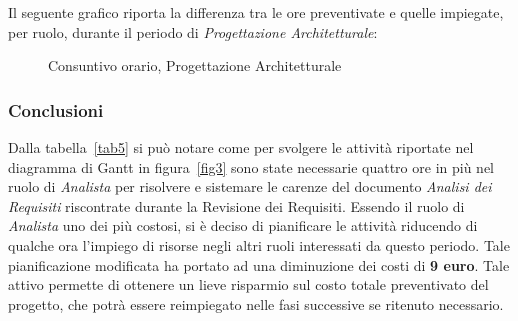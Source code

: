 \newpage
\noindent Il seguente grafico riporta la differenza tra le ore preventivate e quelle impiegate, per ruolo, durante il periodo di \textit{Progettazione Architetturale}:
\begin{figure}[h]
	\centering
	\caption{Consuntivo orario, Progettazione Architetturale}
\end{figure}

\subsubsection{Conclusioni}
Dalla tabella~\ref{tab5} si può notare come per svolgere le attività riportate nel diagramma di \gls{Gantt} in figura~\ref{fig3} sono state necessarie  quattro ore in più nel ruolo di \textit{Analista} per risolvere e sistemare le carenze del documento \textit{Analisi dei Requisiti} riscontrate durante la Revisione dei Requisiti. Essendo il ruolo di \textit{Analista} uno dei più costosi, si è deciso di pianificare le attività riducendo di qualche ora l'impiego di risorse negli altri ruoli interessati da questo periodo. Tale pianificazione modificata ha portato ad una diminuzione dei costi di \textbf{9 euro}. Tale attivo permette di ottenere un lieve risparmio sul costo totale preventivato del progetto, che potrà essere reimpiegato nelle fasi successive se ritenuto necessario. 
